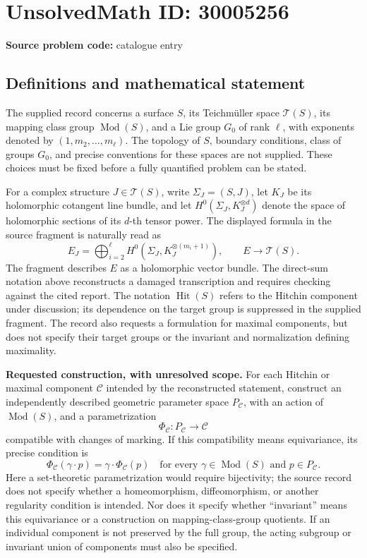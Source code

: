 \documentclass[11pt]{article}
\begin{document}
\section*{UnsolvedMath ID: 30005256}
\textbf{Source problem code:} catalogue entry
\subsection{Definitions and mathematical statement}
The supplied record concerns a surface \(S\), its Teichm\"uller space \(\mathcal T(S)\), its mapping class group \(\operatorname{Mod}(S)\), and a Lie group \(G_0\) of rank \(\ell\), with exponents denoted by \((1,m_2,\ldots,m_\ell)\). The topology of \(S\), boundary conditions, class of groups \(G_0\), and precise conventions for these spaces are not supplied. These choices must be fixed before a fully quantified problem can be stated.

For a complex structure \(J\in\mathcal T(S)\), write \(\Sigma_J=(S,J)\), let \(K_J\) be its holomorphic cotangent line bundle, and let \(H^0(\Sigma_J,K_J^{\otimes d})\) denote the space of holomorphic sections of its \(d\)-th tensor power. The displayed formula in the source fragment is naturally read as
\[
E_J=\bigoplus_{i=2}^{\ell}H^0\!\left(\Sigma_J,K_J^{\otimes(m_i+1)}\right),
\qquad E\longrightarrow\mathcal T(S).
\]
The fragment describes \(E\) as a holomorphic vector bundle. The direct-sum notation above reconstructs a damaged transcription and requires checking against the cited report. The notation \(\operatorname{Hit}(S)\) refers to the Hitchin component under discussion; its dependence on the target group is suppressed in the supplied fragment. The record also requests a formulation for maximal components, but does not specify their target groups or the invariant and normalization defining maximality.

\textbf{Requested construction, with unresolved scope.} For each Hitchin or maximal component \(\mathcal C\) intended by the reconstructed statement, construct an independently described geometric parameter space \(P_{\mathcal C}\), with an action of \(\operatorname{Mod}(S)\), and a parametrization
\[
\Phi_{\mathcal C}:P_{\mathcal C}\longrightarrow\mathcal C
\]
compatible with changes of marking. If this compatibility means equivariance, its precise condition is
\[
\Phi_{\mathcal C}(\gamma\cdot p)
 =\gamma\cdot\Phi_{\mathcal C}(p)
\quad\text{for every }\gamma\in\operatorname{Mod}(S)
\text{ and }p\in P_{\mathcal C}.
\]
Here a set-theoretic parametrization would require bijectivity; the source record does not specify whether a homeomorphism, diffeomorphism, or another regularity condition is intended. Nor does it specify whether ``invariant'' means this equivariance or a construction on mapping-class-group quotients. If an individual component is not preserved by the full group, the acting subgroup or invariant union of components must also be specified.
\end{document}
